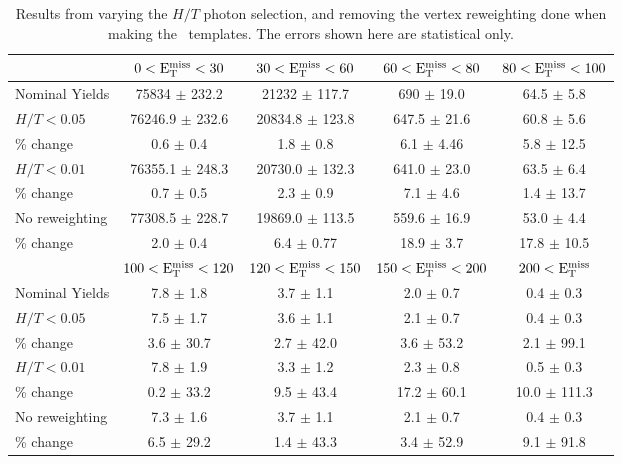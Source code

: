 \begin{table}[htb]
\scriptsize
\begin{center}
\caption{\label{table:photonsystematics} Results from varying the $H/T$ photon selection, and removing the vertex reweighting done when making the \MET\ templates. 
The errors shown here are statistical only.}
\begin{tabular}{l|c|c|c|c}
\hline
\hline
               & $0 < \rm{E_{T}^{miss}} < 30$     & $30 < \rm{E_{T}^{miss}} < 60$  & $60 < \rm{E_{T}^{miss}} < 80$ & $80 < \rm{E_{T}^{miss}} < 100$  \\ 
\hline
Nominal Yields & 75834 $\pm$ 232.2 & 21232   $\pm$ 117.7 & 690 $\pm$ 19.0   & 64.5 $\pm$ 5.8 \\
\hline
$H/T < 0.05$   & 76246.9 $\pm$ 232.6 & 20834.8 $\pm$ 123.8 &  647.5 $\pm$ 21.6 &    60.8 $\pm$ 5.6 \\
\% change      & 0.6 $\pm$ 0.4 &    1.8 $\pm$ 0.8 &    6.1 $\pm$ 4.46 &   5.8 $\pm$ 12.5 \\
\hline
$H/T < 0.01$   & 76355.1 $\pm$ 248.3 & 20730.0 $\pm$ 132.3 &  641.0 $\pm$ 23.0 &    63.5 $\pm$ 6.4 \\
\% change      & 0.7 $\pm$ 0.5 &    2.3 $\pm$ 0.9 &    7.1 $\pm$ 4.6 &   1.4 $\pm$ 13.7 \\
\hline
No reweighting & 77308.5 $\pm$ 228.7 & 19869.0 $\pm$ 113.5 &  559.6 $\pm$ 16.9 &    53.0 $\pm$ 4.4 \\
\% change      & 2.0 $\pm$ 0.4 &    6.4 $\pm$ 0.77 &   18.9 $\pm$ 3.7 &  17.8 $\pm$ 10.5 \\
\hline
\hline
          & $100 < \rm{E_{T}^{miss}} < 120$  & $120 < \rm{E_{T}^{miss}} < 150$  & $150 < \rm{E_{T}^{miss}} < 200$  &    $200 < \rm{E_{T}^{miss}}$  \\ 
\hline
Nominal Yields & 7.8 $\pm$ 1.8 &     3.7 $\pm$ 1.1 &     2.0 $\pm$ 0.7 &     0.4 $\pm$ 0.3 \\
\hline
$H/T < 0.05$   & 7.5 $\pm$ 1.7 &     3.6 $\pm$ 1.1 &     2.1 $\pm$ 0.7 &     0.4 $\pm$ 0.3  \\
\% change      & 3.6 $\pm$ 30.7 &   2.7 $\pm$ 42.0 &   3.6 $\pm$ 53.2 &   2.1 $\pm$ 99.1 \\
\hline
$H/T < 0.01$   & 7.8 $\pm$ 1.9 &     3.3 $\pm$ 1.2 &     2.3 $\pm$ 0.8 &     0.5 $\pm$ 0.3 \\
\% change      & 0.2 $\pm$ 33.2 &   9.5 $\pm$ 43.4 &  17.2 $\pm$ 60.1 & 10.0 $\pm$ 111.3 \\
\hline
No reweighting & 7.3 $\pm$ 1.6 &     3.7 $\pm$ 1.1 &     2.1 $\pm$ 0.7 &     0.4 $\pm$ 0.3 \\
\% change      & 6.5 $\pm$ 29.2 &   1.4 $\pm$ 43.3 &   3.4 $\pm$ 52.9 &   9.1 $\pm$ 91.8 \\
\hline
\hline
\end{tabular}
\end{center}
\end{table} 

